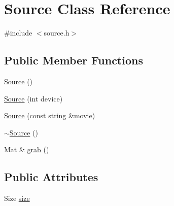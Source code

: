 \hypertarget{class_source}{
\section{Source Class Reference}
\label{class_source}
}


{\ttfamily \#include $<$source.h$>$}

\subsection*{Public Member Functions}
\begin{DoxyCompactItemize}
\item 
\hyperlink{class_source_a660c0a4b8b8f8402568bef86f2cb2fbb}{Source} ()
\item 
\hyperlink{class_source_aefdbc55d88adc315498b669642379eb8}{Source} (int device)
\item 
\hyperlink{class_source_a5c3bf2e7a9d8d75c334a5d11a29eb058}{Source} (const string \&movie)
\item 
\hyperlink{class_source_ac5104a4d66641ae529419b47da4a1473}{$\sim$Source} ()
\item 
Mat \& \hyperlink{class_source_a7ca090eb632f1ca7175adeed540fdc26}{grab} ()
\end{DoxyCompactItemize}
\subsection*{Public Attributes}
\begin{DoxyCompactItemize}
\item 
Size \hyperlink{class_source_aa801cdb298f6ce14f2ec12ab8f288dc3}{size}
\end{DoxyCompactItemize}


